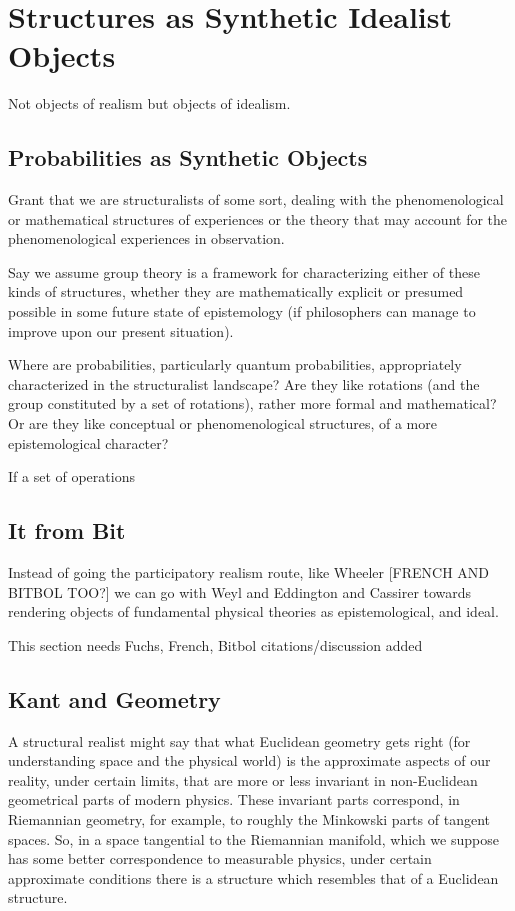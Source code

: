 \section{Structures as Synthetic Idealist Objects}

Not objects of realism but objects of idealism.

\subsection{Probabilities as Synthetic Objects}

Grant that we are structuralists of some sort, dealing with the phenomenological or mathematical structures of experiences or the theory that may account for the phenomenological experiences in observation.  

Say we assume group theory is a framework for characterizing either of these kinds of structures, whether they are mathematically explicit or presumed possible in some future state of epistemology (if philosophers can manage to improve upon our present situation).

Where are probabilities, particularly quantum probabilities, appropriately characterized in the structuralist landscape?  Are they like rotations (and the group constituted by a set of rotations), rather more formal and mathematical?  Or are they like conceptual or phenomenological structures, of a more epistemological character?  

If a set of operations 






\subsection{It from Bit}

Instead of going the participatory realism route, like Wheeler [FRENCH AND BITBOL TOO?] we can go with Weyl and Eddington and Cassirer towards rendering objects of fundamental physical theories as epistemological, and ideal.

This section needs Fuchs, French, Bitbol citations/discussion added

\subsection{Kant and Geometry}

A structural realist might say that what Euclidean geometry gets right (for understanding space and the physical world) is the approximate aspects of our reality, under certain limits, that are more or less invariant in non-Euclidean geometrical parts of modern physics.  These invariant parts correspond, in Riemannian geometry, for example, to roughly the Minkowski parts of tangent spaces.  So, in a space tangential to the Riemannian manifold, which we suppose has some better correspondence to measurable physics, under certain approximate conditions there is a structure which resembles that of a Euclidean structure.




